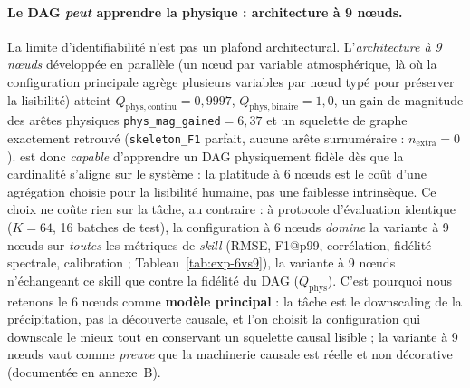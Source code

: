 \paragraph{Le DAG \emph{peut} apprendre la physique : architecture à 9 nœuds.} La limite d'identifiabilité n'est pas un plafond architectural. L'\emph{architecture \Oracle{} à 9 nœuds} développée en parallèle (un nœud par variable atmosphérique, là où la configuration principale agrège plusieurs variables par nœud typé pour préserver la lisibilité) atteint $Q_{\mathrm{phys},\text{continu}}=0{,}9997$, $Q_{\mathrm{phys},\text{binaire}}=1{,}0$, un gain de magnitude des arêtes physiques \texttt{phys\_mag\_gained}$=6{,}37$ et un squelette de graphe exactement retrouvé (\texttt{skeleton\_F1} parfait, aucune arête surnuméraire : $n_{\mathrm{extra}}=0$). \Oracle{} est donc \emph{capable} d'apprendre un DAG physiquement fidèle dès que la cardinalité s'aligne sur le système : la platitude à 6 nœuds est le coût d'une agrégation choisie pour la lisibilité humaine, pas une faiblesse intrinsèque. Ce choix ne coûte rien sur la tâche, au contraire : à protocole d'évaluation identique ($K=64$, 16 batches de test), la configuration à 6 nœuds \emph{domine} la variante à 9 nœuds sur \emph{toutes} les métriques de \emph{skill} (RMSE, F1@p99, corrélation, fidélité spectrale, calibration ; Tableau~\ref{tab:exp-6vs9}), la variante à 9 nœuds n'échangeant ce skill que contre la fidélité du DAG ($Q_{\mathrm{phys}}$). C'est pourquoi nous retenons le 6 nœuds comme \textbf{modèle principal} : la tâche est le downscaling de la précipitation, pas la découverte causale, et l'on choisit la configuration qui downscale le mieux tout en conservant un squelette causal lisible ; la variante à 9 nœuds vaut comme \emph{preuve} que la machinerie causale est réelle et non décorative (documentée en annexe~B).

